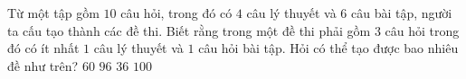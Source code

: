 \begin{ex}%
	Từ một tập gồm $10$ câu hỏi, trong đó có $4$ câu lý thuyết và $6$ câu bài tập, người ta cấu tạo thành các đề thi. Biết rằng trong một đề thi phải gồm $3$ câu hỏi trong đó có ít nhất $1$ câu lý thuyết và $1$ câu hỏi bài tập. Hỏi có thể tạo được bao nhiêu đề như trên?
	\choice 
	{$60$}
	{\True $96$}
	{$36$}
	{$100$}
	
\end{ex}

